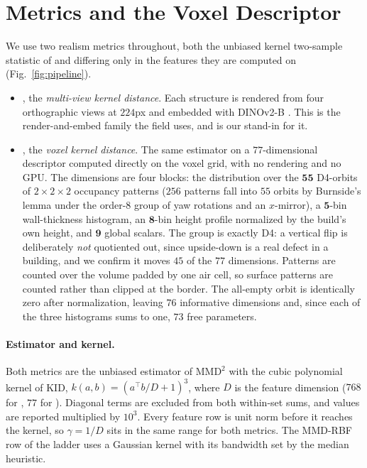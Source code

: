 
\section{Metrics and the Voxel Descriptor}
\label{sec:metrics}

We use two realism metrics throughout, both the unbiased kernel two-sample
statistic of \citet{binkowski2018kid} and differing only in the features they
are computed on (Fig.~\ref{fig:pipeline}).

\begin{itemize}[leftmargin=*,itemsep=1pt,topsep=2pt]
\item \textbf{\mvkid{}}, the \emph{multi-view kernel distance}. Each structure is
  rendered from four orthographic views at $224$px and embedded with DINOv2-B
  \citep{oquab2024dinov2}. This is the render-and-embed family the field uses,
  and is our stand-in for it.
\item \textbf{\vkid{}}, the \emph{voxel kernel distance}. The same estimator on a
  $77$-dimensional descriptor computed directly on the voxel grid, with no
  rendering and no GPU. The dimensions are four blocks: the distribution over
  the $\mathbf{55}$ D4-orbits of $2\times2\times2$ occupancy patterns
  ($256$ patterns fall into $55$ orbits by Burnside's lemma under the order-$8$
  group of yaw rotations and an $x$-mirror), a $\mathbf{5}$-bin wall-thickness
  histogram, an $\mathbf{8}$-bin height profile normalized by the build's own
  height, and $\mathbf{9}$ global scalars. The group is exactly D4: a vertical
  flip is deliberately \emph{not} quotiented out, since upside-down is a real
  defect in a building, and we confirm it moves $45$ of the $77$ dimensions.
  Patterns are counted over the volume padded by one air cell, so surface
  patterns are counted rather than clipped at the border. The all-empty orbit is
  identically zero after normalization, leaving $76$ informative dimensions and,
  since each of the three histograms sums to one, $73$ free parameters.
\end{itemize}

\paragraph{Estimator and kernel.} Both metrics are the unbiased estimator of
$\mathrm{MMD}^2$ with the cubic polynomial kernel of KID,
$k(a,b) = (a^{\top}b/D + 1)^3$, where $D$ is the feature dimension ($768$ for
\mvkid{}, $77$ for \vkid{}). Diagonal terms are excluded from both within-set
sums, and values are reported multiplied by $10^3$. Every feature row is unit
norm before it reaches the kernel, so $\gamma = 1/D$ sits in the same range for
both metrics. The MMD-RBF row of the ladder uses a Gaussian kernel with its
bandwidth set by the median heuristic.

